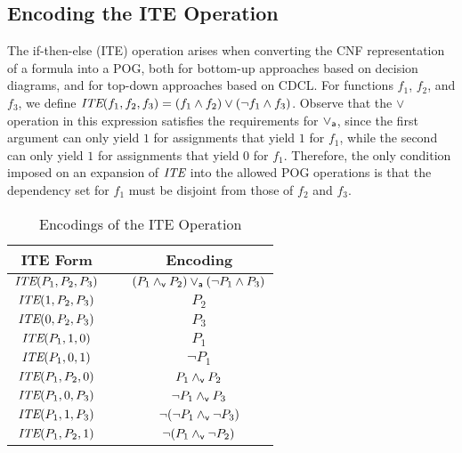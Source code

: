\documentclass{llncs}
\newcommand{\pand}{\mathbin{\land_{\sf v}}}
\newcommand{\por}{\mathbin{\lor_{\sf a}}}
\newcommand{\tautology}{1}
\newcommand{\nil}{0}
\newcommand{\ite}{\mbox{\it ITE}}
\begin{document}
\subsection{Encoding the ITE Operation}
\label{sec:ite}


The if-then-else (ITE) operation arises when converting the CNF representation
of a formula into a  POG, both for
bottom-up approaches based on decision diagrams, and for top-down
approaches based on CDCL\@.  For functions $f_1$, $f_2$, and $f_3$, we
define
$\ite(f_1, f_2, f_3) = (f_1 \land f_2) \lor (\neg f_1 \land f_3)$.
Observe that the $\lor$ operation in this expression satisfies
the requirements for $\por$, since the first argument can only yield
$\tautology$ for assignments that yield $\tautology$ for $f_1$, while
the second can only yield $\tautology$ for assignments that yield
$\nil$ for $f_1$.  Therefore, the only condition imposed on an
expansion of $\ite$ into the allowed POG operations is that the
dependency set for $f_1$ must be disjoint from those of $f_2$ and
$f_3$.

\begin{table}
  \caption{Encodings of the ITE Operation}
  \label{tab:ite}
  \begin{center}
  \begin{tabular}{ccc}
    ITE Form & & Encoding \\
    \midrule
     $\ite(P_1, P_2, P_3)$ & $\;$ & $(P_1 \pand P_2) \por (\neg P_1 \land P_3)$ \\
     $\ite(\tautology, P_2, P_3)$ & $\;$ & $P_2$ \\
     $\ite(\nil, P_2, P_3)$ & $\;$ & $P_3$ \\
     $\ite(P_1, \tautology, \nil)$ & $\;$ & $P_1$ \\
     $\ite(P_1, \nil, \tautology)$ & $\;$ & $\neg P_1$ \\
     $\ite(P_1, P_2, \nil)$ & $\;$ & $P_1 \pand P_2$ \\
     $\ite(P_1, \nil, P_3)$ & $\;$ & $\neg P_1 \pand P_3$ \\
     $\ite(P_1, \tautology, P_3)$ & $\;$ & $\neg (\neg P_1 \pand \neg P_3)$ \\
     $\ite(P_1, P_2, \tautology)$ & $\;$ & $\neg (P_1 \pand \neg P_2)$ \\

  \end{tabular}
  \end{center}
\end{table}
\end{document}
